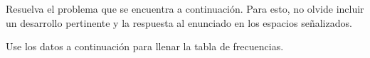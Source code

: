 \documentclass{cdplf-prueba}
\begin{document}
%
\begin{tcbraster}[enhanced,raster columns=3,raster width=\linewidth,raster column skip=3pt,raster force size=false]
    \begin{caja}[title={\sffamily\scshape\bfseries Nombre},height=30pt,add to width=4cm]
    \end{caja}
    \begin{caja}[title={\sffamily\scshape\bfseries Puntaje},height=30pt,add to width=-2cm]
    \end{caja}
    \begin{caja}[title={\sffamily\scshape\bfseries Nota},height=30pt,add to width=-2cm]
    \end{caja}                    
\end{tcbraster}
%
\vspace*{10pt}
\begin{tcolorbox}[boxrule=1pt,colback=white,leftrule=3mm]
    \raggedright Resuelva el problema que se encuentra a continuación. Para esto, no olvide 
    incluir un desarrollo pertinente y la respuesta al enunciado en los espacios señalizados.        
\end{tcolorbox}
Use los datos a continuación para llenar la tabla de frecuencias.
\end{document}
